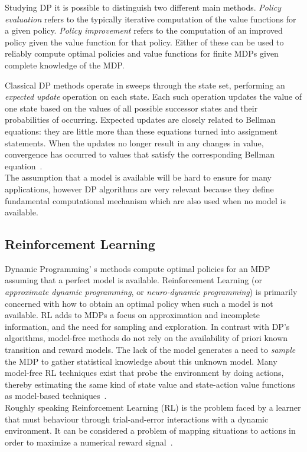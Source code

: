 Studying DP it is possible to distinguish two different main methods. \textit{Policy evaluation} refers to the typically iterative computation of the value functions for a given policy. \textit{Policy improvement} refers to the computation of an improved policy given the value function for that policy. Either of these can be used to reliably compute optimal policies and value functions for finite MDPs given complete knowledge of the MDP.


Classical DP methods operate in sweeps through the state set, performing an \textit{expected update} operation on each state. Each such operation updates the value of one state based on the values of all possible successor states and their probabilities of occurring. Expected updates are closely related to Bellman equations: they are little more than these equations turned into assignment statements. When the updates no longer result in any changes in value, convergence has occurred to values that satisfy the corresponding Bellman equation~\cite{SuttonBarto}. \\

The assumption that a model is available will be hard to ensure for many applications, however DP algorithms are very relevant because they define fundamental computational mechanism which are also used when no model is available. 

\subsection{Reinforcement Learning}
Dynamic Programming' s methods compute optimal policies for an MDP assuming that a perfect model is available. Reinforcement Learning (or \textit{approximate dynamic programming}, or \textit{neuro-dynamic programming}) is primarily concerned with how to obtain an optimal policy when such a model is not available. RL adds to MDPs a focus on approximation and incomplete information, and the need for sampling and exploration. In contrast with DP's algorithms, model-free methods do not rely on the availability of priori known transition and reward models. The lack of the model generates a need to \textit{sample} the MDP to gather statistical knowledge about this unknown model. Many model-free RL techniques exist that probe the environment by doing actions, thereby estimating the same kind of state value and state-action value functions as model-based techniques~\cite{wiering2012reinforcement}.\\

Roughly speaking Reinforcement Learning (RL) is the problem faced by a learner that must behaviour through trial-and-error interactions with a dynamic environment. It can be considered a problem of mapping situations to actions in order to maximize a numerical reward signal~\cite{RLDef1}. \\

